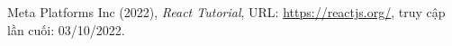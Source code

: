 \cleardoublepage
{}
{}

\begin{thebibliography}{1}
Meta Platforms Inc (2022), \emph{React Tutorial}, URL: \url{https://reactjs.org/}, truy cập lần cuối: 03/10/2022. 


\end{thebibliography}